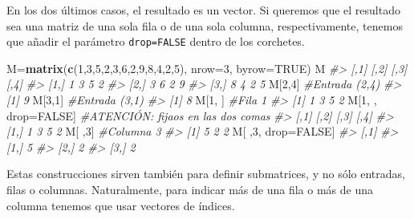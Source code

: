 \documentclass[
]{book}
\newenvironment{Shaded}{\begin{snugshade}}{\end{snugshade}}
\newcommand{\CommentTok}[1]{\textcolor[rgb]{0.56,0.35,0.01}{\textit{#1}}}
\newcommand{\DataTypeTok}[1]{\textcolor[rgb]{0.13,0.29,0.53}{#1}}
\newcommand{\DecValTok}[1]{\textcolor[rgb]{0.00,0.00,0.81}{#1}}
\newcommand{\KeywordTok}[1]{\textcolor[rgb]{0.13,0.29,0.53}{\textbf{#1}}}
\newcommand{\NormalTok}[1]{#1}
\newcommand{\OtherTok}[1]{\textcolor[rgb]{0.56,0.35,0.01}{#1}}
\theoremstyle{definition}
\theoremstyle{definition}
\theoremstyle{definition}
\theoremstyle{remark}
\begin{document}
En los dos últimos casos, el resultado es un vector. Si queremos que el resultado sea una matriz de una sola fila o de una sola columna, respectivamente, tenemos que añadir el parámetro \texttt{drop=FALSE} dentro de los corchetes.

\begin{Shaded}
\begin{Highlighting}[]
\NormalTok{M=}\KeywordTok{matrix}\NormalTok{(}\KeywordTok{c}\NormalTok{(}\DecValTok{1}\NormalTok{,}\DecValTok{3}\NormalTok{,}\DecValTok{5}\NormalTok{,}\DecValTok{2}\NormalTok{,}\DecValTok{3}\NormalTok{,}\DecValTok{6}\NormalTok{,}\DecValTok{2}\NormalTok{,}\DecValTok{9}\NormalTok{,}\DecValTok{8}\NormalTok{,}\DecValTok{4}\NormalTok{,}\DecValTok{2}\NormalTok{,}\DecValTok{5}\NormalTok{), }\DataTypeTok{nrow=}\DecValTok{3}\NormalTok{, }\DataTypeTok{byrow=}\OtherTok{TRUE}\NormalTok{)}
\NormalTok{M}
\CommentTok{\#\textgreater{}      [,1] [,2] [,3] [,4]}
\CommentTok{\#\textgreater{} [1,]    1    3    5    2}
\CommentTok{\#\textgreater{} [2,]    3    6    2    9}
\CommentTok{\#\textgreater{} [3,]    8    4    2    5}
\NormalTok{M[}\DecValTok{2}\NormalTok{,}\DecValTok{4}\NormalTok{]  }\CommentTok{\#Entrada (2,4)}
\CommentTok{\#\textgreater{} [1] 9}
\NormalTok{M[}\DecValTok{3}\NormalTok{,}\DecValTok{1}\NormalTok{]  }\CommentTok{\#Entrada (3,1)}
\CommentTok{\#\textgreater{} [1] 8}
\NormalTok{M[}\DecValTok{1}\NormalTok{, ]  }\CommentTok{\#Fila 1}
\CommentTok{\#\textgreater{} [1] 1 3 5 2}
\NormalTok{M[}\DecValTok{1}\NormalTok{, , drop=}\OtherTok{FALSE}\NormalTok{] }\CommentTok{\#ATENCIÓN: fijaos en las dos comas}
\CommentTok{\#\textgreater{}      [,1] [,2] [,3] [,4]}
\CommentTok{\#\textgreater{} [1,]    1    3    5    2}
\NormalTok{M[ ,}\DecValTok{3}\NormalTok{]  }\CommentTok{\#Columna 3}
\CommentTok{\#\textgreater{} [1] 5 2 2}
\NormalTok{M[ ,}\DecValTok{3}\NormalTok{, drop=}\OtherTok{FALSE}\NormalTok{]}
\CommentTok{\#\textgreater{}      [,1]}
\CommentTok{\#\textgreater{} [1,]    5}
\CommentTok{\#\textgreater{} [2,]    2}
\CommentTok{\#\textgreater{} [3,]    2}
\end{Highlighting}
\end{Shaded}

Estas construcciones sirven también para definir submatrices, y no sólo entradas, filas o columnas. Naturalmente, para indicar más de una fila o más de una columna tenemos que usar vectores de índices.
\end{document}
